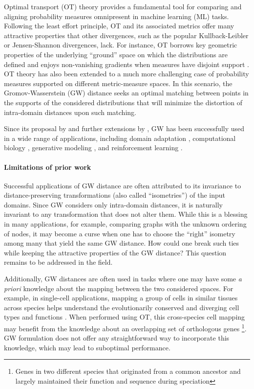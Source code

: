 Optimal transport (OT) theory provides a fundamental tool for comparing and
aligning probability measures omnipresent in machine learning (ML) tasks.
Following the least effort principle, OT and its associated metrics offer
many attractive properties that other divergences, such as the popular Kullback-Leibler or
Jensen-Shannon divergences, lack. For instance, OT borrows key geometric properties of
the underlying ``ground'' space on which the distributions are defined \citep{Villani03}
and enjoys non-vanishing gradients when measures have disjoint support \citep{Arjovsky17}.
OT theory has also been extended to a much more challenging case of probability measures supported
on different metric-measure spaces. In this scenario, the Gromov-Wasserstein (GW) distance
seeks an optimal matching between points in the supports of the considered distributions
that will minimize the distortion of intra-domain distances upon such matching.

Since its proposal by \citet{Memoli11} and further extensions by \citet{Peyre16},
GW has been successfully used in a wide range of applications, including
domain adaptation \citep{Yan18}, computational biology
\citep{Nitzan2019,Pamona,UniPort,SpaOTsc,Demetci20,Demetci22,PASTE},
generative modeling \citep{Bunne19}, and reinforcement learning \citep{GW-VAE}.

\paragraph{Limitations of prior work} Successful applications of GW distance are often
attributed to its invariance to distance-preserving transformations (also called ``isometries'')
of the input domains. Since GW considers only intra-domain distances, it is naturally invariant
to any transformation that does not alter them. While this is a blessing in many applications,
for example, comparing graphs with the unknown ordering of nodes, it may become a curse
when one has to choose the ``right'' isometry among many that yield the same GW distance.
How could one break such ties while keeping the attractive properties of the GW distance?
This question remains to be addressed in the field.

Additionally, GW distances are often used in tasks where one may have some
\textit{a priori} knowledge about the mapping between the two considered spaces.
For example, in single-cell applications, mapping a group of cells in similar tissues
across species helps understand the evolutionarily conserved and diverging cell types
and functions \citep{kriebel2022uinmf}. When performed using OT, this cross-species cell mapping
may benefit from the knowledge about an overlapping set of orthologous genes
\footnote {Genes in two different species that originated from a common ancestor and
largely maintained their function and sequence during speciation}.
GW formulation does not offer any straightforward way to incorporate this knowledge,
which may lead to suboptimal performance.


